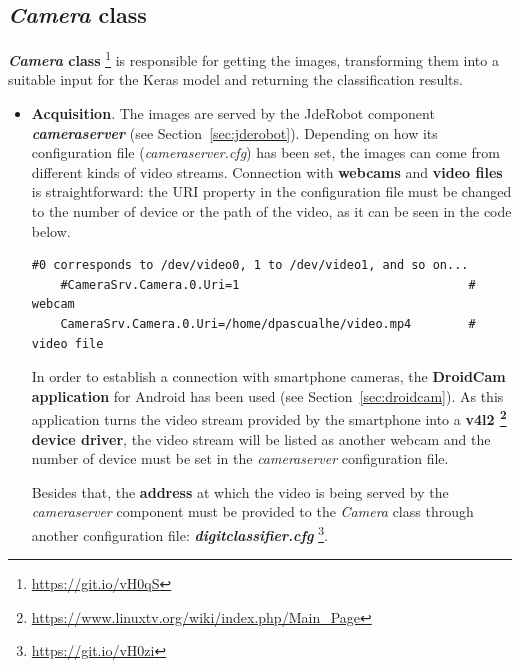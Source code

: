 \subsection{\textit{Camera} class}
\textbf{\textit{Camera} class} \footnote{\url{https://git.io/vH0qS}} is responsible for getting the images, transforming them into a suitable input for the Keras model and returning the classification results.

\begin{itemize}
	\item \textbf{Acquisition}. The images are served by the JdeRobot component \textbf{\textit{cameraserver}} (see Section~\ref{sec:jderobot}). Depending on how its configuration file (\textit{cameraserver.cfg}) has been set, the images can come from different kinds of video streams. Connection with \textbf{webcams} and \textbf{video files} is straightforward: the URI property in the configuration file must be changed to the number of device or the path of the video, as it can be seen in the code below.
	\begin{lstlisting}[frame=single]
	#0 corresponds to /dev/video0, 1 to /dev/video1, and so on...
	#CameraSrv.Camera.0.Uri=1                                # webcam
	CameraSrv.Camera.0.Uri=/home/dpascualhe/video.mp4        # video file
	\end{lstlisting}
	
	In order to establish a connection with smartphone cameras, the \textbf{DroidCam application} for Android has been used (see Section~\ref{sec:droidcam}). As this application turns the video stream provided by the smartphone into a \textbf{v4l2 \footnote{\url{https://www.linuxtv.org/wiki/index.php/Main_Page}} device driver}, the video stream will be listed as another webcam and the number of device must be set in the \textit{cameraserver} configuration file.
	
	Besides that, the \textbf{address} at which the video is being served by the \textit{cameraserver} component must be provided to the \textit{Camera} class through another configuration file: \textbf{\textit{digitclassifier.cfg}} \footnote{\url{https://git.io/vH0zi}}.
	

\end{itemize}
